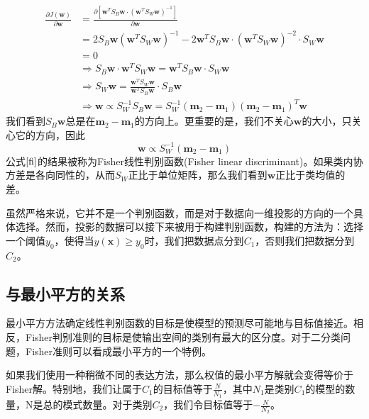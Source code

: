 \begin{equation}
	\begin{aligned}
	\frac{\partial J(\boldsymbol{w})}{\partial \boldsymbol{w}}&=\frac{\partial [\boldsymbol{w}^TS_B\boldsymbol{w}\cdot (\boldsymbol{w}^TS_W\boldsymbol{w})^{-1}]}{\partial\boldsymbol{w}}\\
		&=2S_B\boldsymbol{w}(\boldsymbol{w}^TS_W\boldsymbol{w})^{-1}-2\boldsymbol{w}^TS_B\boldsymbol{w}\cdot (\boldsymbol{w}^TS_W\boldsymbol{w})^{-2}\cdot S_W\boldsymbol{w}\\
		&=0\\
		&\Rightarrow S_B\boldsymbol{w}\cdot \boldsymbol{w}^TS_W\boldsymbol{w}=\boldsymbol{w}^TS_B\boldsymbol{w}\cdot  S_W\boldsymbol{w}\\
		&\Rightarrow S_W\boldsymbol{w}=\frac{\boldsymbol{w}^TS_W\boldsymbol{w}}{\boldsymbol{w}^TS_B\boldsymbol{w}}\cdot S_B\boldsymbol{w}\\
		&\Rightarrow \boldsymbol{w} \propto S_W^{-1}S_B\boldsymbol{w}=S_W^{-1}(\boldsymbol{m}_2-\boldsymbol{m}_1)(\boldsymbol{m}_2-\boldsymbol{m}_1)^T\boldsymbol{w}
	\end{aligned}
\end{equation}
我们看到$S_B\boldsymbol{w}$总是在$\boldsymbol{m}_2-\boldsymbol{m}_1$的方向上。更重要的是，我们不关心$\boldsymbol{w}$的大小，只关心它的方向，因此
\begin{equation}
\label{fi}
	\boldsymbol{w}\propto S_W^{-1}(\boldsymbol{m}_2-\boldsymbol{m}_1)
\end{equation}
公式$\ref{fi}$的结果被称为Fisher线性判别函数(Fisher linear discriminant)。如果类内协方差是各向同性的，从而$S_W$正比于单位矩阵，那么我们看到$\boldsymbol{w}$正比于类均值的差。

虽然严格来说，它并不是一个判别函数，而是对于数据向一维投影的方向的一个具体选择。然而，投影的数据可以接下来被用于构建判别函数，构建的方法为：选择一个阈值$y_0$，使得当$y(\boldsymbol{x})\geqslant y_0$时，我们把数据点分到$C_1$，否则我们把数据分到$C_2$。
\subsection*{与最小平方的关系}
最小平方方法确定线性判别函数的目标是使模型的预测尽可能地与目标值接近。相反，Fisher判别准则的目标是使输出空间的类别有最大的区分度。对于二分类问题，Fisher准则可以看成最小平方的一个特例。

如果我们使用一种稍微不同的表达方法，那么权值的最小平方解就会变得等价于Fisher解。特别地，我们让属于$C_1$的目标值等于$\frac{N}{N_1}$，其中$N_1$是类别$C_1$的模型的数量，N是总的模式数量。对于类别$C_2$，我们令目标值等于$-\frac{N}{N_2}$。

